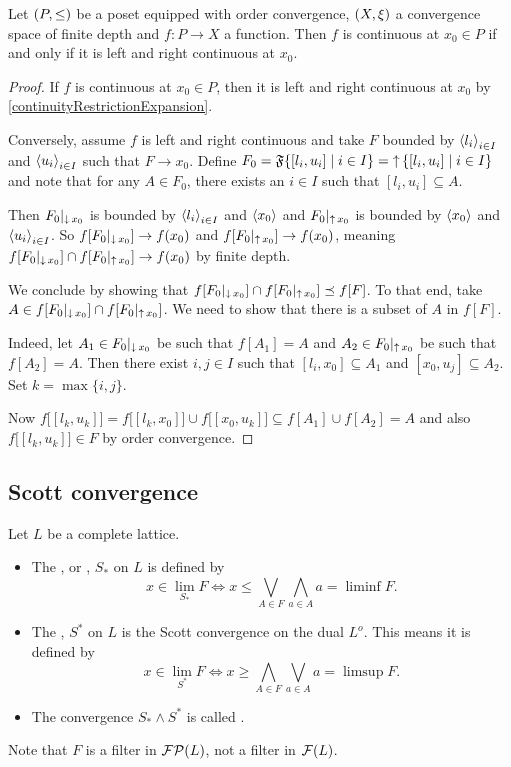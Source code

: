 \begin{proposition} \label{leftRightConvergence}
Let $\left( P,\leq \right)$ be a poset equipped with order convergence, $\left( X,\xi \right)$ a convergence space of finite depth and $f: P\to X$ a function. Then $f$ is continuous at $x_0\in P$ \textup{if and only if} it is left and right continuous at $x_0$.
\end{proposition}
\begin{proof}
If $f$ is continuous at $x_0\in P$, then it is left and right continuous at $x_0$ by \ref{continuityRestrictionExpansion}.

Conversely, assume $f$ is left and right continuous and take $F$ bounded by $\left\langle l_i \right\rangle_{i\in I}$ and $\left\langle u_i \right\rangle_{i\in I}$ such that $F\to x_0$. Define $F_0 = \mathfrak{F}\setbuilder{[l_i, u_i]}{i\in I} = \upset \setbuilder{[l_i, u_i]}{i\in I}$ and note that for any $A\in F_0$, there exists an $i\in I$ such that $[l_i,u_i]\subseteq A$.


Then $F_0|_{\operatorname{\downarrow} x_0}$ is bounded by $\left\langle l_i \right\rangle_{i\in I}$ and $\left\langle x_0 \right\rangle$ and $F_0|_{\operatorname{\uparrow} x_0}$ is bounded by $\left\langle x_0 \right\rangle$ and $\left\langle u_i \right\rangle_{i\in I}$. So $f[F_0|_{\operatorname{\downarrow} x_0}] \to f(x_0)$ and $f[F_0|_{\operatorname{\uparrow} x_0}] \to f(x_0)$, meaning $f[F_0|_{\operatorname{\downarrow} x_0}]\cap f[F_0|_{\operatorname{\uparrow} x_0}] \to f(x_0)$ by finite depth.

We conclude by showing that $f[F_0|_{\operatorname{\downarrow} x_0}]\cap f[F_0|_{\operatorname{\uparrow} x_0}] \preceq f[F]$. To that end, take $A\in f[F_0|_{\operatorname{\downarrow} x_0}]\cap f[F_0|_{\operatorname{\uparrow} x_0}]$. We need to show that there is a subset of $A$ in $f[F]$.

Indeed, let $A_1\in F_0|_{\operatorname{\downarrow} x_0}$ be such that $f[A_1] = A$ and $A_2\in F_0|_{\operatorname{\uparrow} x_0}$ be such that $f[A_2] = A$.
Then there exist $i,j\in I$ such that $[l_i,x_0]\subseteq A_1$ and $[x_0, u_j]\subseteq A_2$. Set $k = \max\{i,j\}$.

Now $f\Big[[l_k,u_k]\Big] = f\Big[[l_k,x_0]\Big] \cup f\Big[[x_0,u_k]\Big]\subseteq f[A_1]\cup f[A_2] = A$ and also $f\Big[[l_k,u_k]\Big]\in F$ by order convergence.
\end{proof}

\subsection{Scott convergence}

\begin{definition}
Let $L$ be a complete lattice.
\begin{itemize}
\item The , or , $S_*$ on $L$ is defined by
\[ x \in \lim_{S_*} F \iff x \leq \bigvee_{A\in F}\bigwedge_{a\in A}a = \liminf F. \]

\item The , $S^*$ on $L$ is the Scott convergence on the dual $L^o$. This means it is defined by
\[ x \in \lim_{S^*} F \iff x \geq \bigwedge_{A\in F}\bigvee_{a\in A}a = \limsup F. \]
\item The convergence $S_* \wedge S^*$ is called .
\end{itemize}
\end{definition}
Note that $F$ is a filter in $\operatorname{\mathcal{FP}}(L)$, not a filter in $\operatorname{\mathcal{F}}(L)$.

